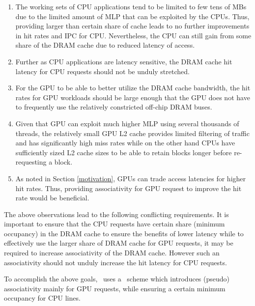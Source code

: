 \begin{enumerate}[label=(\roman*)]
	\item The working sets of CPU applications tend to be limited to few tens of MBs due to the limited amount of MLP that can be exploited by the CPUs. Thus, providing larger than certain share of cache leads to no further improvements in hit rates and IPC for CPU. Nevertheless, the CPU can still gain from some share of the DRAM cache due to reduced latency of access.
	\item Further as CPU applications are latency sensitive, the DRAM cache hit latency for CPU requests should not be unduly stretched.
	\item For the GPU to be able to better utilize the DRAM cache bandwidth, the hit rates for GPU workloads should be large enough that the GPU does not have to frequently use the relatively constricted off-chip DRAM buses.	
	\item Given that GPU can exploit much higher MLP using several thousands of threads, the relatively small GPU L2 cache provides limited filtering of traffic and has significantly high miss rates while on the other hand CPUs have sufficiently sized L2 cache sizes to be able to retain blocks longer before re-requesting a block.	
	\item As noted in Section \ref{motivation}, GPUs can trade access latencies for higher hit rates. Thus, providing associativity for GPU request to improve the hit rate would be beneficial.
\end{enumerate}

\par The above observations lead to the following conflicting requirements. It is important to ensure that the CPU requests have certain share (minimum occupancy) in the DRAM cache to ensure the benefits of lower latency while to effectively use the larger share of DRAM cache for GPU requests, it may be required to increase  associativity of the DRAM cache. However such an associativity should not unduly increase the hit latency for CPU requests. 
\par To accomplish the above goals, \cachename\ uses a \chaining\ scheme which introduces (pseudo) associativity mainly for GPU requests, while ensuring a certain minimum occupancy for CPU lines.
